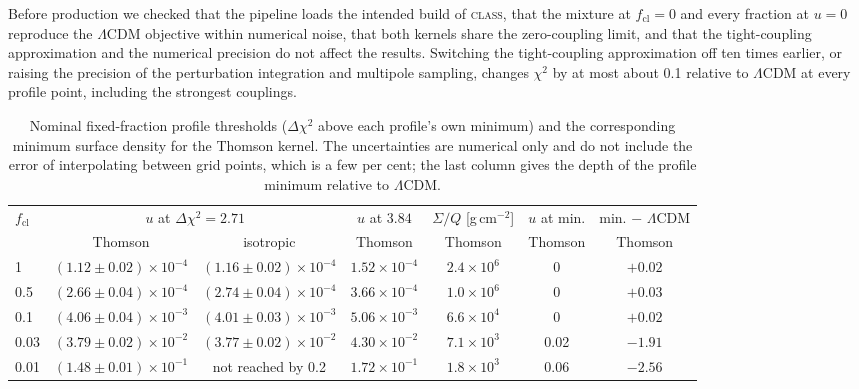 \documentclass[11pt,a4paper]{article}
\newcommand{\cl}{\mathrm{cl}}
\newcommand{\dchi}{\Delta\chi^2}
\begin{document}
Before production we checked that the pipeline loads the intended build of \textsc{class}, that the mixture at $f_\cl = 0$ and every fraction at $u = 0$ reproduce the $\Lambda$CDM objective within numerical noise, that both kernels share the zero-coupling limit, and that the tight-coupling approximation and the numerical precision do not affect the results. Switching the tight-coupling approximation off ten times earlier, or raising the precision of the perturbation integration and multipole sampling, changes $\chi^2$ by at most about 0.1 relative to $\Lambda$CDM at every profile point, including the strongest couplings.

\begin{table}[t]
\centering
\small
\caption{Nominal fixed-fraction profile thresholds ($\dchi$ above each profile's own minimum) and the corresponding minimum surface density for the Thomson kernel. The uncertainties are numerical only and do not include the error of interpolating between grid points, which is a few per cent; the last column gives the depth of the profile minimum relative to $\Lambda$CDM.}
\label{tab:mix}
\setlength{\tabcolsep}{3pt}
\footnotesize
\begin{tabular}{lcccccc}
\toprule
$f_\cl$ & \multicolumn{2}{c}{$u$ at $\dchi = 2.71$} & $u$ at $3.84$ & $\Sigma/Q$ [g\,cm$^{-2}$] & $u$ at min. & min. $-$ $\Lambda$CDM \\
 & Thomson & isotropic & Thomson & Thomson & Thomson & Thomson \\
\midrule
1 & $(1.12\pm0.02)\times10^{-4}$ & $(1.16\pm0.02)\times10^{-4}$ & $1.52\times10^{-4}$ & $2.4\times10^{6}$ & 0 & $+0.02$ \\
0.5 & $(2.66\pm0.04)\times10^{-4}$ & $(2.74\pm0.04)\times10^{-4}$ & $3.66\times10^{-4}$ & $1.0\times10^{6}$ & 0 & $+0.03$ \\
0.1 & $(4.06\pm0.04)\times10^{-3}$ & $(4.01\pm0.03)\times10^{-3}$ & $5.06\times10^{-3}$ & $6.6\times10^{4}$ & 0 & $+0.02$ \\
0.03 & $(3.79\pm0.02)\times10^{-2}$ & $(3.77\pm0.02)\times10^{-2}$ & $4.30\times10^{-2}$ & $7.1\times10^{3}$ & 0.02 & $-1.91$ \\
0.01 & $(1.48\pm0.01)\times10^{-1}$ & not reached by 0.2 & $1.72\times10^{-1}$ & $1.8\times10^{3}$ & 0.06 & $-2.56$ \\
\bottomrule
\end{tabular}
\end{table}
\end{document}
